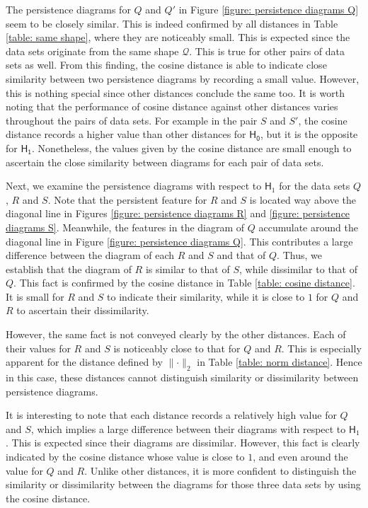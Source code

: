 \documentclass[sn-mathphys-num]{sn-jnl}%
\theoremstyle{thmstyleone}%
\theoremstyle{thmstyletwo}%
\theoremstyle{thmstylethree}%
\begin{document}
The persistence diagrams for $Q$ and $Q'$ in Figure \ref{figure: persistence diagrams Q} seem to be closely similar. This is indeed confirmed by all distances in Table \ref{table: same shape}, where they are noticeably small. This is expected since the data sets originate from the same shape $\mathcal{Q}$. This is true for other pairs of data sets as well. From this finding, the cosine distance is able to indicate close similarity between two persistence diagrams by recording a small value. However, this is nothing special since other distances conclude the same too. It is worth noting that the performance of cosine distance against other distances varies throughout the pairs of data sets. For example in the pair $S$ and $S'$, the cosine distance records a higher value than other distances for $\mathsf{H_0}$, but it is the opposite for $\mathsf{H_1}$. Nonetheless, the values given by the cosine distance are small enough to ascertain the close similarity between diagrams for each pair of data sets.

Next, we examine the persistence diagrams with respect to $\mathsf{H}_1$ for the data sets $Q$, $R$ and $S$. Note that the persistent feature for $R$ and $S$ is located way above the diagonal line in Figures \ref{figure: persistence diagrams R} and \ref{figure: persistence diagrams S}. Meanwhile, the features in the diagram of $Q$ accumulate around the diagonal line in Figure \ref{figure: persistence diagrams Q}. This contributes a large difference between the diagram of each $R$ and $S$ and that of $Q$. Thus, we establish that the diagram of $R$ is similar to that of $S$, while dissimilar to that of $Q$. This fact is confirmed by the cosine distance in Table \ref{table: cosine distance}. It is small for $R$ and $S$ to indicate their similarity, while it is close to $1$ for $Q$ and $R$ to ascertain their dissimilarity.

However, the same fact is not conveyed clearly by the other distances. Each of their values for $R$ and $S$ is noticeably close to that for $Q$ and $R$. This is especially apparent for the distance defined by $\lVert\cdot\rVert_2$ in Table \ref{table: norm distance}. Hence in this case, these distances cannot distinguish similarity or dissimilarity between persistence diagrams.

It is interesting to note that each distance records a relatively high value for $Q$ and $S$, which implies a large difference between their diagrams with respect to $\mathsf{H}_1$. This is expected since their diagrams are dissimilar. However, this fact is clearly indicated by the cosine distance whose value is close to $1$, and even around the value for $Q$ and $R$. Unlike other distances, it is more confident to distinguish the similarity or dissimilarity between the diagrams for those three data sets by using the cosine distance.
\end{document}
